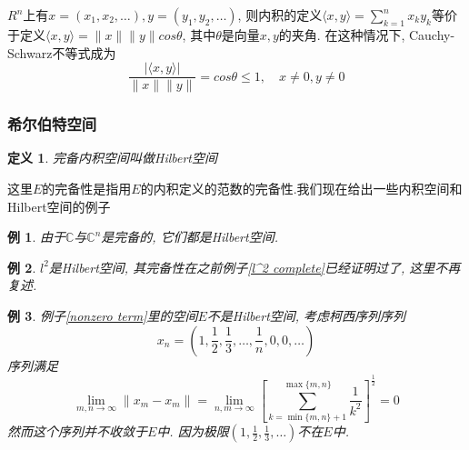 \documentclass[a4paper,11pt]{article}
\newtheorem{definition}{\hspace{2em}定义}[section]
\newtheorem{example}{例}[section]
\begin{document}
$R^n$上有$x=(x_1,x_2,\dots),y=(y_1,y_2,\dots)$, 则内积的定义$\langle x,y\rangle=\sum_{k=1}^{n}x_ky_k$等价于定义$\langle x,y\rangle=\|x\|\|y\|cos\theta$, 其中$\theta$是向量$x,y$的夹角. 在这种情况下, Cauchy-Schwarz不等式成为
\begin{equation*}
  \frac{|\langle x,y\rangle|}{\|x\|\|y\|}=cos\theta\leq 1,\quad x\neq0,y\neq0
\end{equation*}
\subsubsection*{希尔伯特空间}
\begin{definition}
  完备内积空间叫做Hilbert空间
\end{definition}
这里$E$的完备性是指用$E$的内积定义的范数的完备性.我们现在给出一些内积空间和Hilbert空间的例子
\begin{example}
  由于$\mathbb{C}$与$\mathbb{C}^n$是完备的, 它们都是Hilbert空间.
\end{example}
\begin{example}
  $l^2$是Hilbert空间, 其完备性在之前例子\ref{l^2 complete}已经证明过了, 这里不再复述.
\end{example}
\begin{example}
  例子\ref{nonzero term}里的空间$E$不是Hilbert空间, 考虑柯西序列序列
  \begin{equation*}
    x_n=(1,\frac{1}{2},\frac{1}{3},\dots,\frac{1}{n},0,0,\dots)
  \end{equation*}
  序列满足
  \begin{equation*}
    \lim_{m,n\to\infty}\|x_m-x_m\|=\lim_{n,m\to\infty}\left[\sum_{k=\min{\{m,n\}+1}}^{\max\{m,n\}}\frac{1}{k^2}\right]^{\frac{1}{2}}=0
  \end{equation*}
  然而这个序列并不收敛于$E$中. 因为极限$(1,\frac{1}{2},\frac{1}{3},\dots)$不在$E$中.
\end{example}
\end{document}
